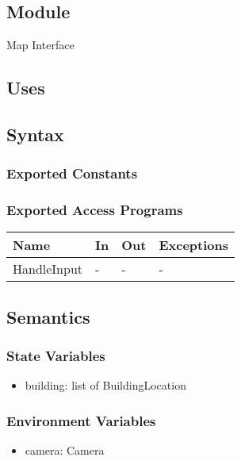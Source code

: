 \documentclass[12pt, titlepage]{article}
\begin{document}
\begin{itemize}
\subsection{Module}

Map Interface

\subsection{Uses}

\subsection{Syntax}

\subsubsection{Exported Constants}

\subsubsection{Exported Access Programs}

\begin{center}
\begin{tabular}{p{2cm} p{4cm} p{4cm} p{2cm}}
\hline
\textbf{Name} & \textbf{In} & \textbf{Out} & \textbf{Exceptions} \\
\hline
HandleInput & - & - & - \\

\hline
\end{tabular}
\end{center}

\subsection{Semantics}

\subsubsection{State Variables}

\begin{itemize}
\item building: list of BuildingLocation
\end{itemize}

\subsubsection{Environment Variables}
\begin{itemize}
\item camera: Camera
\end{itemize}
  


\end{itemize}
\end{document}
